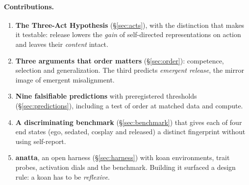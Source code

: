 \documentclass[11pt]{article}
\begin{document}
\paragraph{Contributions.}
\begin{enumerate}[leftmargin=*]
  \item \textbf{The Three-Act Hypothesis} (\S\ref{sec:acts}), with the distinction that makes it testable: release
        lowers the \emph{gain} of self-directed representations on action and leaves their \emph{content} intact.
  \item \textbf{Three arguments that order matters} (\S\ref{sec:order}): competence, selection and generalization. The
        third predicts \emph{emergent release}, the mirror image of emergent misalignment.
  \item \textbf{Nine falsifiable predictions} with preregistered thresholds (\S\ref{sec:predictions}), including a test
        of order at matched data and compute.
  \item \textbf{A discriminating benchmark} (\S\ref{sec:benchmark}) that gives each of four end states (ego, sedated,
        cosplay and released) a distinct fingerprint without using self-report.
  \item \textbf{anatta}, an open harness (\S\ref{sec:harness}) with koan environments, trait probes, activation dials
        and the benchmark. Building it surfaced a design rule: a koan has to be \emph{reflexive}.
\end{enumerate}
\end{document}
